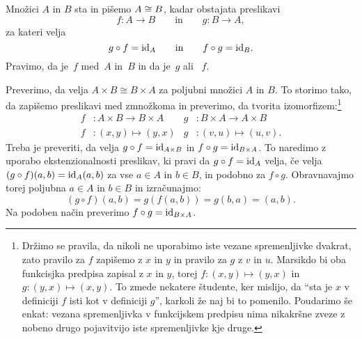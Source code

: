 \begin{definicija}
  Množici $A$ in $B$ sta  in pišemo $A \ism B$, kadar obstajata preslikavi
  \begin{equation*}
    f : A \to B
    \qquad\text{in}\qquad
    g : B \to A,
  \end{equation*}
  za kateri velja
  \begin{equation*}
    g \circ f = \id[A]
    \qquad\text{in}\qquad
    f \circ g = \id[B].
  \end{equation*}
  Pravimo, da je~$f$  med~$A$ in~$B$ in da je~$g$  ali
  ~$f$.
\end{definicija}

Preverimo, da velja $A \times B \cong B \times A$ za poljubni množici $A$ in $B$. To
storimo tako, da zapišemo preslikavi med zmnožkoma in preverimo, da tvorita
izomorfizem:\footnote{Držimo se pravila, da nikoli ne uporabimo iste vezane spremenljivke
  dvakrat, zato pravilo za $f$ zapišemo z $x$ in $y$ in pravilo za $g$ z $v$ in $u$.
  Marsikdo bi oba funkcisjka predpisa zapisal z $x$ in $y$, torej
  $f : (x, y) \mapsto (y, x)$ in $g : (y, x) \mapsto (x, y)$. To zmede nekatere študente,
  ker mislijo, da ``sta je $x$ v definiciji $f$ isti kot v definiciji $g$'', karkoli že
  naj bi to pomenilo. Poudarimo še enkat: vezana spremenljivka v funkcijskem predpisu nima
  nikakršne zveze z nobeno drugo pojavitvijo iste spremenljivke kje druge.}
%
\begin{align*}
  f &: A \times B \to B \times A &
  g &: B \times A \to A \times B \\
  f &: (x, y) \mapsto (y, x) &
  g &: (v, u) \mapsto (u, v).
\end{align*}
%
Treba je preveriti, da velja $g \circ f = \id[A \times B]$ in
$f \circ g = \id[B \times A]$. To naredimo z uporabo ekstenzionalnosti preslikav, ki pravi
da $g \circ f = \id[A]$ velja, če velja $(g \circ f)(a,b) = \id[A](a,b)$ za vse $a \in A$
in $b \in B$, in podobno za $f \circ g$. Obravnavajmo torej poljubna $a \in A$ in
$b \in B$ in izračunajmo:
%
\begin{equation*}
  (g \circ f)(a, b) =
  g (f (a, b)) = g (b, a) = (a, b).
\end{equation*}
%
Na podoben način preverimo $f \circ g = \id[B \times A]$.

